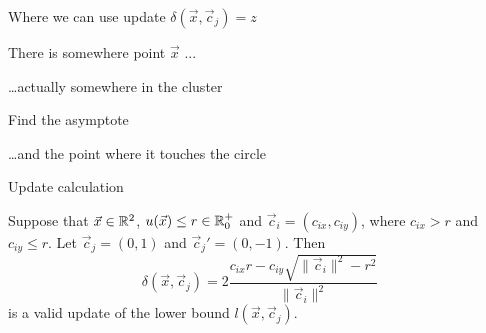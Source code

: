 \documentclass[10pt, compress]{beamer}
\newcommand{\x}{\vec{x}}
\newcommand{\cj}{\vec{c}_j}
\newcommand{\ci}{\vec{c}_i}
\newcommand{\ux}{u(\x)}
\newcommand{\lxcj}{l(\x, \cj)}
\newcommand{\deltaxcj}{\delta(\x, \cj)}
\begin{document}
\begin{frame}{Where we can use update $\deltaxcj = z$}
  \begin{center}
    
  \end{center}
\end{frame}

\begin{frame}{There is somewhere point $\x$ ...}
  \begin{center}
    
  \end{center}
\end{frame}

\begin{frame}{\ldots actually somewhere in the cluster}
  \begin{center}
    
  \end{center}
\end{frame}

\begin{frame}{Find the asymptote}
  \begin{center}
    
  \end{center}
\end{frame}

\begin{frame}{\ldots and the point where it touches the circle}
  \begin{center}
    
  \end{center}
\end{frame}

\begin{frame}{Update calculation}
\vspace{-0.5cm}
\begin{lemma}
Suppose that $\x \in \R^2$, $\ux \leq r \in \Rpz$ and $\ci = (c_{ix}, c_{iy})$,
where $c_{ix} > r$ and $c_{iy} \leq r$. Let $\cj=(0,1)$ and $\cj'=(0,-1)$. Then
\begin{equation*}
    \deltaxcj =
        2\frac{
            c_{ix} r
            -
            c_{iy} \sqrt{\| \ci \|^2 - r^2}
        }{
             \| \ci \|^2
        }
\end{equation*}
is a valid update of the lower bound $\lxcj$.
\end{lemma}
  \begin{center}
    
  \end{center}
\end{frame}
\end{document}
